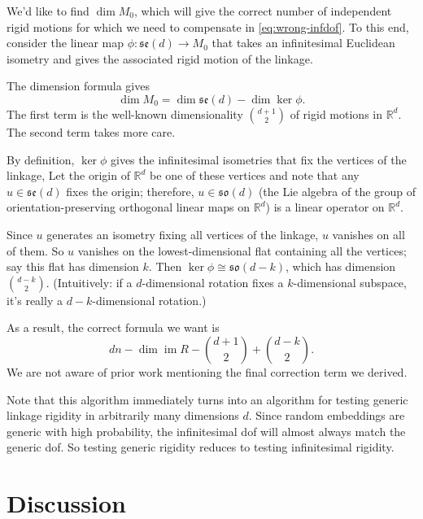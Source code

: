 \documentclass[aps,prd,final,twocolumn,letterpaper,nofootinbib]{revtex4-1}
\newcommand\RR{\mathbb{R}}
\DeclareMathOperator\im{im}
\begin{document}
We'd like to find $\dim M_0$,
which will give the correct number of independent rigid motions
for which we need to compensate in \cref{eq:wrong-infdof}.
To this end,
consider the linear map $\phi\colon\mathfrak{se}(d) \to M_0$
that takes an infinitesimal Euclidean isometry
and gives the associated rigid motion of the linkage.

The dimension formula gives
\[
    \dim M_0 = \dim\mathfrak{se}(d) - \dim\ker\phi.
\]
The first term is the well-known dimensionality $\binom{d+1}{2}$
of rigid motions in $\RR^d$.
The second term takes more care.

By definition, $\ker\phi$ gives the infinitesimal isometries
that fix the vertices of the linkage,
Let the origin of $\RR^d$ be one of these vertices
and note that any $u\in \mathfrak{se}(d)$ fixes the origin;
therefore, $u\in\mathfrak{so}(d)$
(the Lie algebra of the group
of orientation-preserving orthogonal linear maps on $\RR^d$)
is a linear operator on $\RR^d$.

Since $u$ generates an isometry fixing all vertices of the linkage,
$u$ vanishes on all of them.
So $u$ vanishes on the lowest-dimensional flat containing all the vertices;
say this flat has dimension $k$.
Then $\ker\phi\cong\mathfrak{so}(d-k)$, which has dimension $\binom{d-k}{2}$.
(Intuitively: if a $d$-dimensional rotation fixes a $k$-dimensional subspace,
it's really a $d-k$-dimensional rotation.)

As a result, the correct formula we want is
\begin{equation}
    dn - \dim\im R - \binom{d+1}{2} + \binom{d-k}{2}.
\end{equation}
We are not aware of prior work mentioning the final correction term we derived.

Note that this algorithm immediately turns into an algorithm
for testing generic linkage rigidity in arbitrarily many dimensions $d$.
Since random embeddings are generic with high probability,
the infinitesimal dof will almost always match the generic dof.
So testing generic rigidity reduces to testing infinitesimal rigidity.


\section{Discussion}
\end{document}
